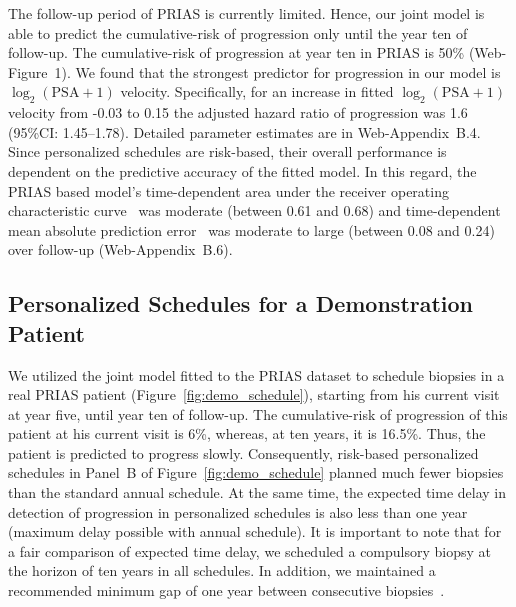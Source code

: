 The follow-up period of PRIAS is currently limited. Hence, our joint model is able to predict the cumulative-risk of progression only until the year ten of follow-up. The cumulative-risk of progression at year ten in PRIAS is 50\% (Web-Figure~1). We found that the strongest predictor for progression in our model is $\log_2(\mbox{PSA} + 1)$ velocity. Specifically, for an increase in fitted $\log_2(\mbox{PSA} + 1)$ velocity from -0.03 to 0.15 the adjusted hazard ratio of progression was 1.6 (95\%CI: 1.45--1.78). Detailed parameter estimates are in Web-Appendix~B.4. Since personalized schedules are risk-based, their overall performance is dependent on the predictive accuracy of the fitted model. In this regard, the PRIAS based model's time-dependent area under the receiver operating characteristic curve~\citep{rizopoulos2011dynamic} was moderate (between 0.61 and 0.68) and time-dependent mean absolute prediction error~\citep{rizopoulos2011dynamic} was moderate to large (between 0.08 and 0.24) over follow-up (Web-Appendix~B.6).

\subsection{Personalized Schedules for a Demonstration Patient}
We utilized the joint model fitted to the PRIAS dataset to schedule biopsies in a real PRIAS patient (Figure~\ref{fig:demo_schedule}), starting from his current visit at year five, until year ten of follow-up. The cumulative-risk of progression of this patient at his current visit is 6\%, whereas, at ten years, it is 16.5\%. Thus, the patient is predicted to progress slowly. Consequently, risk-based personalized schedules in Panel~B of Figure~\ref{fig:demo_schedule} planned much fewer biopsies than the standard annual schedule. At the same time, the expected time delay in detection of progression in personalized schedules is also less than one year (maximum delay possible with annual schedule). It is important to note that for a fair comparison of expected time delay, we scheduled a compulsory biopsy at the horizon of ten years in all schedules. In addition, we maintained a recommended minimum gap of one year between consecutive biopsies~\citep{bokhorst2016decade}.

